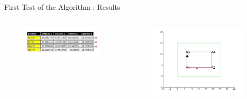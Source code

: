 \documentclass[utf8,compress]{beamer}
\begin{document}
\begin{frame}[containsverbatim]{First Test of the Algorithm : Results}
\begin{columns}
\begin{column}{0.6\textwidth}

    \begin{figure}[h]
        \includegraphics[width=\textwidth]{mesures.png}
    \end{figure}
\end {column}

\begin{column}{0.4\textwidth}

    \begin{figure}[h]
        \includegraphics[width=\textwidth]{pos5.jpg}
    \end{figure}

\end{column}

\end{columns}
\end{frame}
\end{document}
